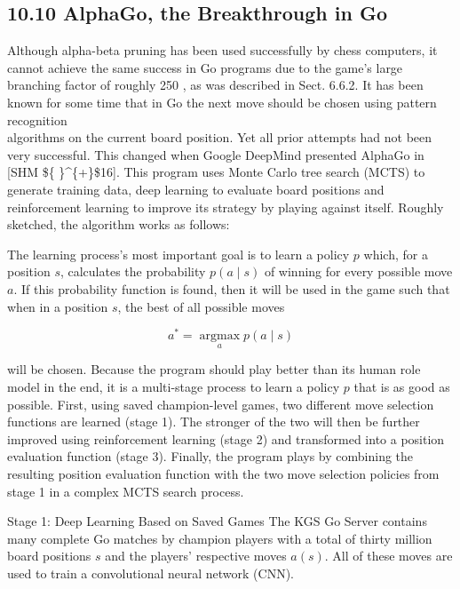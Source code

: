 \documentclass[10pt]{book}
\begin{document}
\begin{center}
\begin{enumerate}
\begin{center}
\begin{center}
\begin{center}
\begin{center}
\begin{center}
\subsection*{10.10 AlphaGo, the Breakthrough in Go}
Although alpha-beta pruning has been used successfully by chess computers, it cannot achieve the same success in Go programs due to the game's large branching factor of roughly 250 , as was described in Sect. 6.6.2. It has been known for some time that in Go the next move should be chosen using pattern recognition\\[0pt]
algorithms on the current board position. Yet all prior attempts had not been very successful. This changed when Google DeepMind presented AlphaGo in [SHM \$\{ \}\^{}\{+\}\$16]. This program uses Monte Carlo tree search (MCTS) to generate training data, deep learning to evaluate board positions and reinforcement learning to improve its strategy by playing against itself. Roughly sketched, the algorithm works as follows:


The learning process's most important goal is to learn a policy $p$ which, for a position $s$, calculates the probability $p(a \mid s)$ of winning for every possible move $a$. If this probability function is found, then it will be used in the game such that when in a position $s$, the best of all possible moves

$$
a^{*}=\underset{a}{\operatorname{argmax}} p(a \mid s)
$$

will be chosen. Because the program should play better than its human role model in the end, it is a multi-stage process to learn a policy $p$ that is as good as possible. First, using saved champion-level games, two different move selection functions are learned (stage 1). The stronger of the two will then be further improved using reinforcement learning (stage 2) and transformed into a position evaluation function (stage 3). Finally, the program plays by combining the resulting position evaluation function with the two move selection policies from stage 1 in a complex MCTS search process.

Stage 1: Deep Learning Based on Saved Games The KGS Go Server contains many complete Go matches by champion players with a total of thirty million board positions $s$ and the players' respective moves $a(s)$. All of these moves are used to train a convolutional neural network (CNN).


\end{center}
\end{center}
\end{center}
\end{center}
\end{center}
\end{enumerate}
\end{center}
\end{document}
